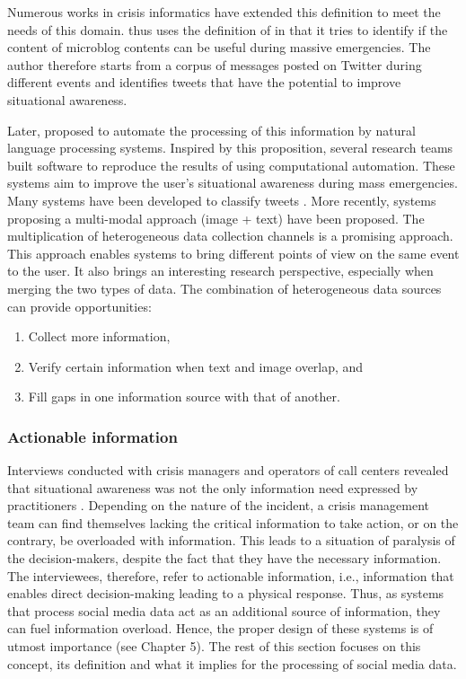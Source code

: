 Numerous works in crisis informatics have extended this definition to meet the needs of this domain.
thus uses the definition of \textcite{endsleyTheorySituationAwareness1995} in that it tries to identify if the content of microblog contents can be useful during massive emergencies.
The author therefore starts from a corpus of messages posted on Twitter during different events and identifies tweets that have the potential to improve situational awareness.

Later, proposed to automate the processing of this information by natural language processing systems.
Inspired by this proposition, several research teams built software to reproduce the results of using computational automation.
These systems aim to improve the user's situational awareness during mass emergencies.
Many systems have been developed to classify tweets \parencite{carageaClassifyingTextMessages2011, imranAIDRArtificialIntelligence2014,ashktorabTweedrMiningTwitter2014}.
More recently, systems proposing a multi-modal approach (image + text) have been proposed.
The multiplication of heterogeneous data collection channels is a promising approach.
This approach enables systems to bring different points of view on the same event to the user.
It also brings an interesting research perspective, especially when merging the two types of data.
The combination of heterogeneous data sources can provide opportunities:

\begin{enumerate}
    \item Collect more information,
    \item Verify certain information when text and image overlap, and
    \item Fill gaps in one information source with that of another.
\end{enumerate}

\subsubsection{Actionable information}
Interviews conducted with crisis managers and operators of call centers revealed that situational awareness was not the only information need expressed by practitioners
\parencite{zadeSituationalAwarenessActionability2018, kropczynskiIdentifyingActionableInformation2018}.
Depending on the nature of the incident, a crisis management team can find themselves lacking
the critical information to take action, or on the contrary, be overloaded with information.
This leads to a situation of paralysis of the decision-makers, despite the fact that they have the necessary information.
The interviewees, therefore, refer to actionable information, i.e., information that enables direct decision-making leading to a physical response.
Thus, as systems that process social media data act as an additional source of information, they can fuel information overload.
Hence, the proper design of these systems is of utmost importance (see Chapter 5).
The rest of this section focuses on this concept, its definition and what it implies for the processing of social media data.

